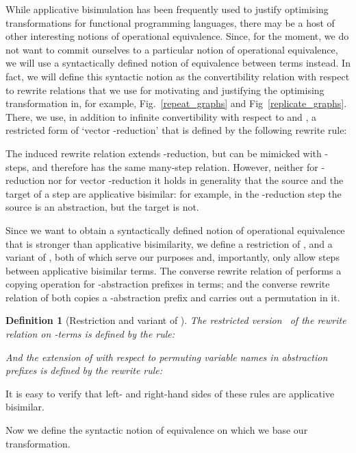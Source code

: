 \documentclass[submission,copyright,creativecommons]{eptcs}
\newtheorem{definition}[theorem]{Definition}
\newcommand{\nbd}{\nobreakdash}
\newcommand{\nbde}{\nobreakdash-\hspace*{0pt}}
\renewcommand\;{\,}
\begin{document}
While applicative bisimulation has been frequently used to justify optimising transformations
for functional programming languages, there may be a host of other interesting notions of operational equivalence.
Since, for the moment, we do not want to commit ourselves to a particular notion of operational equivalence, 
we will use a syntactically defined notion of equivalence between terms instead.
In fact, we will define this  syntactic notion as the convertibility relation with respect to 
rewrite relations that we use for motivating and justifying the optimising transformation
in, for example, Fig.~\ref{repeat_graphs} and Fig~\ref{replicate_graphs}.  
There, we use, in addition to infinite convertibility with respect to  and ,
a restricted form of `vector \nbde{}reduction' that is defined by the following rewrite rule:

The induced rewrite relation  extends \nbde{}reduction, but can be mimicked with \nbd-steps,
and therefore has the same many-step relation.
However, neither for \nbde{}reduction nor for vector \nbde{}reduction
it holds in generality that the source and the target of a step are applicative bisimilar:
for example, in the \nbde{}reduction step 
the source is an abstraction, but the target is not.

Since we want to obtain a syntactically defined notion of operational equivalence that is stronger than applicative bisimilarity,
we define a restriction  of , and a variant  of ,
both of which serve our purposes and, importantly, only allow steps between applicative bisimilar terms.
The converse rewrite relation  of  
performs a copying operation for \nbde{}abstraction prefixes in terms;
and the converse rewrite relation  of 
both copies a \nbde{}abstraction prefix and carries out a permutation in it.

\begin{definition}[Restriction and variant of ]
  \normalfont\label{def:vecetazeropermred}
The restricted version~ of the rewrite relation  on \nbd-terms is defined by the rule:

And the extension   of  with respect to permuting variable names in abstraction prefixes
  is defined by the rewrite rule: 


\end{definition}
It is easy to verify that left- and right-hand sides of these rules are applicative bisimilar. 

Now we define the syntactic notion of equivalence on which we base our transformation. 
\end{document}
